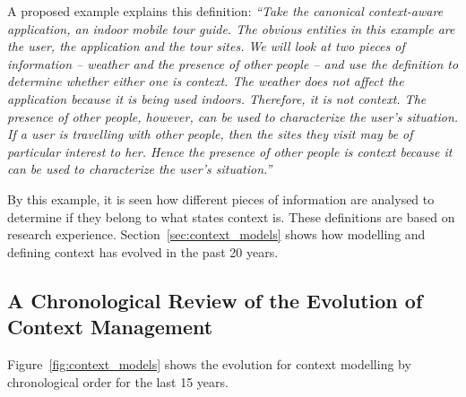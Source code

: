A proposed example explains this definition: \textit{``Take the canonical 
context-aware application, an indoor mobile tour guide. The obvious entities in 
this example are the user, the application and the tour sites. We will look at 
two pieces of information – weather and the presence of other people – and use 
the definition to determine whether either one is context. The weather does not 
affect the application because it is being used indoors. Therefore, it is not 
context. The presence of other people, however, can be used to characterize the 
user's situation. If a user is travelling with other people, then the sites they 
visit may be of particular interest to her. Hence the presence of other people 
is context because it can be used to characterize the user's situation.''~\citep{dey_understanding_2001}}

By this example, it is seen how different pieces of information are analysed to
determine if they belong to what \citeauthor{dey_understanding_2001} states 
context is. These definitions are based on research experience. 
Section~\ref{sec:context_models} shows how modelling and defining context has 
evolved in the past 20 years. 



\subsection{A Chronological Review of the Evolution of Context Management}
\label{sec:chronological_review}
Figure~\ref{fig:context_models} shows the evolution for context modelling by 
chronological order for the last 15 years. 

\vspace{1cm}
\setlength\taskwidth{1.9cm}

\begin{timeline}
  \label{chr:context}
\end{timeline}


